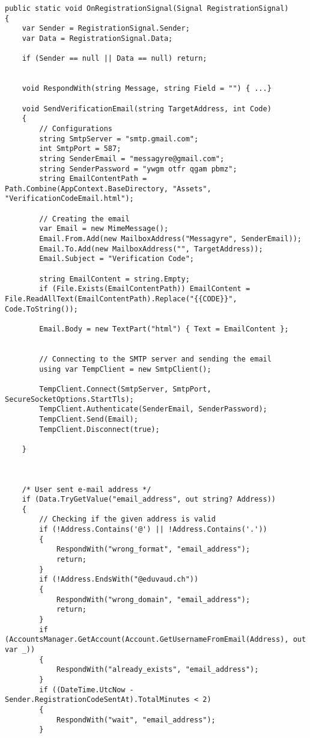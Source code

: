 \documentclass{article}
\begin{document}
\begin{verbatim}
public static void OnRegistrationSignal(Signal RegistrationSignal)
{
    var Sender = RegistrationSignal.Sender;
    var Data = RegistrationSignal.Data;

    if (Sender == null || Data == null) return;


    void RespondWith(string Message, string Field = "") { ...}

    void SendVerificationEmail(string TargetAddress, int Code)
    {
        // Configurations
        string SmtpServer = "smtp.gmail.com";
        int SmtpPort = 587;
        string SenderEmail = "messagyre@gmail.com";
        string SenderPassword = "ywgm otfr qgam pbmz";
        string EmailContentPath = Path.Combine(AppContext.BaseDirectory, "Assets", "VerificationCodeEmail.html");

        // Creating the email
        var Email = new MimeMessage();
        Email.From.Add(new MailboxAddress("Messagyre", SenderEmail));
        Email.To.Add(new MailboxAddress("", TargetAddress));
        Email.Subject = "Verification Code";

        string EmailContent = string.Empty;
        if (File.Exists(EmailContentPath)) EmailContent = File.ReadAllText(EmailContentPath).Replace("{{CODE}}", Code.ToString());

        Email.Body = new TextPart("html") { Text = EmailContent };


        // Connecting to the SMTP server and sending the email
        using var TempClient = new SmtpClient();

        TempClient.Connect(SmtpServer, SmtpPort, SecureSocketOptions.StartTls);
        TempClient.Authenticate(SenderEmail, SenderPassword);
        TempClient.Send(Email);
        TempClient.Disconnect(true);

    }



    /* User sent e-mail address */
    if (Data.TryGetValue("email_address", out string? Address))
    {
        // Checking if the given address is valid 
        if (!Address.Contains('@') || !Address.Contains('.'))
        {
            RespondWith("wrong_format", "email_address");
            return;
        }
        if (!Address.EndsWith("@eduvaud.ch"))
        {
            RespondWith("wrong_domain", "email_address");
            return;
        }
        if (AccountsManager.GetAccount(Account.GetUsernameFromEmail(Address), out var _))
        {
            RespondWith("already_exists", "email_address");
        }
        if ((DateTime.UtcNow - Sender.RegistrationCodeSentAt).TotalMinutes < 2)
        {
            RespondWith("wait", "email_address");
        }


\end{verbatim}
\end{document}
